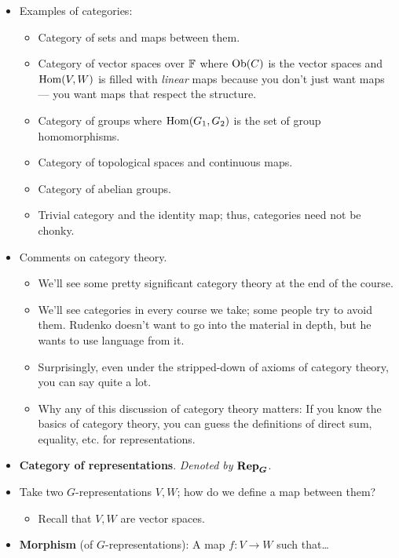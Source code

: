 \documentclass[../notes.tex]{subfiles}
\begin{document}
\begin{itemize}
\begin{itemize}
    \end{itemize}
    \item Examples of categories:
    \begin{itemize}
        \item Category of sets and maps between them.
        \item Category of vector spaces over $\mathbb{F}$ where $\operatorname{Ob}(C)$ is the vector spaces and $\operatorname{Hom}(V,W)$ is filled with \emph{linear} maps because you don't just want maps --- you want maps that respect the structure.
        \item Category of groups where $\operatorname{Hom}(G_1,G_2)$ is the set of group homomorphisms.
        \item Category of topological spaces and continuous maps.
        \item Category of abelian groups.
        \item Trivial category and the identity map; thus, categories need not be chonky.
    \end{itemize}
    \pagebreak
    \item Comments on category theory.
    \begin{itemize}
        \item We'll see some pretty significant category theory at the end of the course.
        \item We'll see categories in every course we take; some people try to avoid them. Rudenko doesn't want to go into the material in depth, but he wants to use language from it.
        \item Surprisingly, even under the stripped-down of axioms of category theory, you can say quite a lot.
        \item Why any of this discussion of category theory matters: If you know the basics of category theory, you can guess the definitions of direct sum, equality, etc. for representations.
    \end{itemize}
    \item \textbf{Category of representations}. \emph{Denoted by} $\bm{\Rep_G}$.
    \item Take two $G$-representations $V,W$; how do we define a map between them?
    \begin{itemize}
        \item Recall that $V,W$ are vector spaces.
    \end{itemize}
    \item \textbf{Morphism} (of $G$-representations): A map $f:V\to W$ such that\dots
    \begin{enumerate}

\end{enumerate}
\end{itemize}
\end{document}
